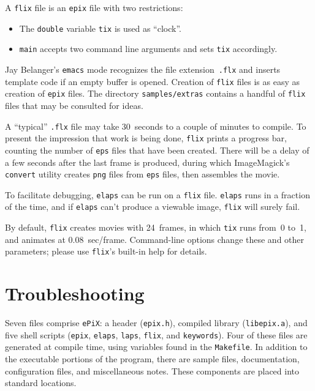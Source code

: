 \documentclass[12pt]{report}
\newcommand{\code}[1]{\texttt{#1}}
\newcommand{\filename}[1]{\texttt{#1}}
\newcommand{\ePiX}{\code{ePiX}}
\begin{document}
A \code{flix} file is an \code{epix} file with two restrictions:
\begin{itemize}
  \item The \code{double} variable \code{tix} is used as
  ``clock''.

  \item \code{main} accepts two command line arguments and sets
  \code{tix} accordingly.
\end{itemize}
Jay Belanger's \code{emacs} mode recognizes the file
extension~\filename{.flx} and inserts template code if an empty
buffer is opened. Creation of \code{flix} files is as easy as creation
of \code{epix} files.  The directory \filename{samples/extras}
contains a handful of \code{flix} files that may be consulted for
ideas.

A ``typical'' \code{.flx} file may take 30~seconds to a couple of
minutes to compile. To present the impression that work is being done,
\code{flix} prints a progress bar, counting the number of
\filename{eps} files that have been created. There will be a delay of
a few seconds after the last frame is produced, during which
ImageMagick's \code{convert} utility creates \code{png} files from
\filename{eps} files, then assembles the movie.

To facilitate debugging, \code{elaps} can be run on a \code{flix}
file. \code{elaps} runs in a fraction of the time, and if \code{elaps}
can't produce a viewable image, \code{flix} will surely fail.

By default, \code{flix} creates movies with 24~frames, in which
\code{tix} runs from~0 to~1, and animates at $0.08$~sec/frame.
Command-line options change these and other parameters; please use
\code{flix}'s built-in help for details.  


\section{Troubleshooting}

Seven files comprise \ePiX: a header (\filename{epix.h}), compiled
library (\filename{libepix.a}), and five shell scripts (\code{epix},
\code{elaps}, \code{laps}, \code{flix}, and \code{keywords}). Four of
these files are generated at compile time, using variables found in
the \filename{Makefile}.  In addition to the executable portions of
the program, there are sample files, documentation, configuration
files, and miscellaneous notes.  These components are placed into
standard locations.
\end{document}
